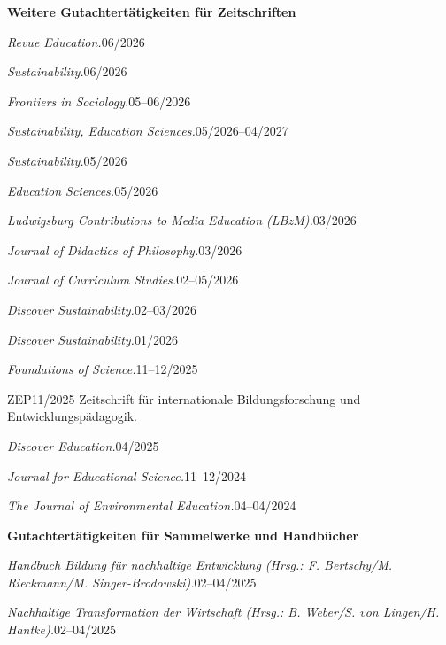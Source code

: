     \resumeProjectHeading
      {\textbf{Weitere Gutachtertätigkeiten für Zeitschriften}}{}

    \resumeProjectHeading
      {\textit{Revue Education.}}{06/2026}

    \resumeProjectHeading
      {\textit{Sustainability.}}{06/2026}

    \resumeProjectHeading
      {\textit{Frontiers in Sociology.}}{05–06/2026}

    \resumeProjectHeading
      {\textit{Sustainability, Education Sciences.}}{05/2026–04/2027}

    \resumeProjectHeading
      {\textit{Sustainability.}}{05/2026}

    \resumeProjectHeading
      {\textit{Education Sciences.}}{05/2026}

    \resumeProjectHeading
      {\textit{Ludwigsburg Contributions to Media Education (LBzM).}}{03/2026}

    \resumeProjectHeading
      {\textit{Journal of Didactics of Philosophy.}}{03/2026}

    \resumeProjectHeading
      {\textit{Journal of Curriculum Studies.}}{02–05/2026}

        \resumeProjectHeading
      {\textit{Discover Sustainability.}}{02–03/2026}


    \resumeProjectHeading
      {\textit{Discover Sustainability.}}{01/2026}

    \resumeProjectHeading
      {\textit{Foundations of Science.}}{11–12/2025}

    \resumeSubheading
      {ZEP}{11/2025}
      {Zeitschrift für internationale Bildungsforschung und Entwicklungspädagogik.}{}

    \resumeProjectHeading
      {\textit{Discover Education.}}{04/2025}

    \resumeProjectHeading
      {\textit{Journal for Educational Science.}}{11–12/2024}

    \resumeProjectHeading
      {\textit{The Journal of Environmental Education.}}{04–04/2024}


    \resumeProjectHeading
      {\textbf{Gutachtertätigkeiten für Sammelwerke und Handbücher}}{}

        \resumeProjectHeading
      {\textit{Handbuch Bildung für nachhaltige Entwicklung (Hrsg.: F. Bertschy/M. Rieckmann/M. Singer-Brodowski).}}{02–04/2025}


        \resumeProjectHeading
      {\textit{Nachhaltige Transformation der Wirtschaft (Hrsg.: B. Weber/S. von Lingen/H. Hantke).}}{02–04/2025}



